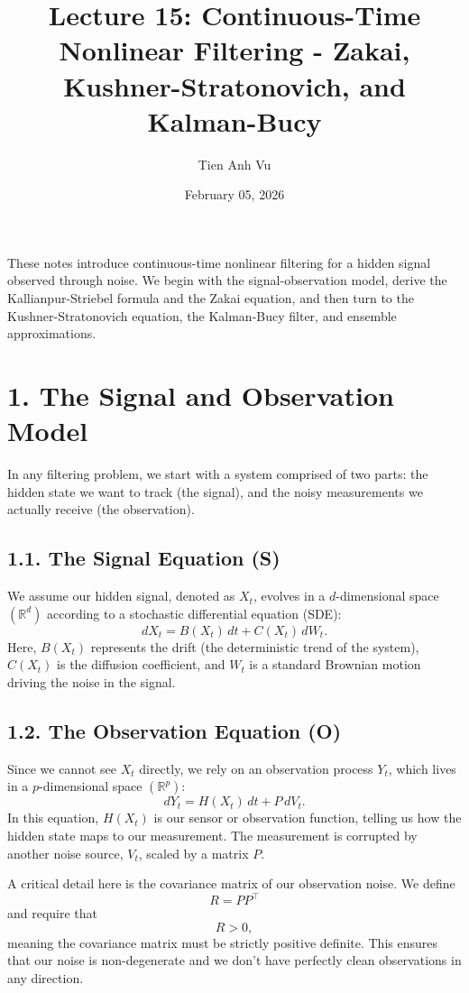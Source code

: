 \documentclass[11pt]{article}
\title{Lecture 15: Continuous-Time Nonlinear Filtering - Zakai, Kushner-Stratonovich, and Kalman-Bucy}
\date{February 05, 2026}
\author{Tien Anh Vu}
\theoremstyle{definition}
\theoremstyle{remark}
\begin{document}
\maketitle

These notes introduce continuous-time nonlinear filtering for a hidden signal observed through noise. We begin with the signal-observation model, derive the Kallianpur-Striebel formula and the Zakai equation, and then turn to the Kushner-Stratonovich equation, the Kalman-Bucy filter, and ensemble approximations.

\section*{1. The Signal and Observation Model}
In any filtering problem, we start with a system comprised of two parts: the hidden state we want to track (the signal), and the noisy measurements we actually receive (the observation).

\subsection*{1.1. The Signal Equation (S)}
We assume our hidden signal, denoted as $X_t$, evolves in a $d$-dimensional space $(\mathbb R^d)$ according to a stochastic differential equation (SDE):
\[
dX_t = B(X_t)\,dt + C(X_t)\,dW_t.
\]
Here, $B(X_t)$ represents the drift (the deterministic trend of the system), $C(X_t)$ is the diffusion coefficient, and $W_t$ is a standard Brownian motion driving the noise in the signal.

\subsection*{1.2. The Observation Equation (O)}
Since we cannot see $X_t$ directly, we rely on an observation process $Y_t$, which lives in a $p$-dimensional space $(\mathbb R^p)$:
\[
dY_t = H(X_t)\,dt + P\,dV_t.
\]
In this equation, $H(X_t)$ is our sensor or observation function, telling us how the hidden state maps to our measurement. The measurement is corrupted by another noise source, $V_t$, scaled by a matrix $P$.

A critical detail here is the covariance matrix of our observation noise. We define
\[
R = PP^\top
\]
and require that
\[
R>0,
\]
meaning the covariance matrix must be strictly positive definite. This ensures that our noise is non-degenerate and we don't have perfectly clean observations in any direction.
\end{document}
